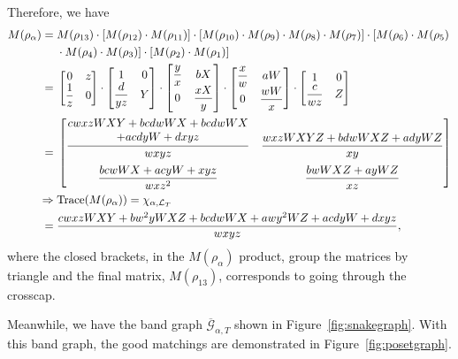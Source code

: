 \documentclass[pdftex]{sigma}
\numberwithin{equation}{section}
\theoremstyle{definition}
\begin{document}
Therefore, we have
\begin{align*}
 M( \rho _{\alpha }) ={}&M( \rho _{13}) \cdot [ M( \rho _{12}) \cdot M( \rho _{11})] \cdot [ M( \rho _{10}) \cdot M( \rho _{9}) \cdot M( \rho _{8}) \cdot M( \rho _{7})] \cdot [ M( \rho _{6}) \cdot M( \rho _{5}) \\
&	\cdot	M( \rho _{4}) \cdot M( \rho _{3})] \cdot [ M( \rho _{2}) \cdot M( \rho _{1})]
\\
={}&\begin{bmatrix}
0 & z\\
\dfrac{1}{z} & 0
\end{bmatrix} \cdot \begin{bmatrix}
1 & 0\\
\dfrac{d}{yz} & Y
\end{bmatrix} \cdot \begin{bmatrix}
\dfrac{y}{x} & bX\\
0 & \dfrac{xX}{y}
\end{bmatrix} \cdot \begin{bmatrix}
\dfrac{x}{w} & aW\\
0 & \dfrac{wW}{x}
\end{bmatrix} \cdot \begin{bmatrix}
1 & 0\\
\dfrac{c}{wz} & Z
\end{bmatrix}
\\
={}&\begin{bmatrix}
\dfrac{\begin{array}{@{}c@{}} cwxzWXY+bcdwWX+bcdwWX\\ +acdyW+dxyz\end{array}}{wxyz} & \dfrac{wxzWXYZ+bdwWXZ+adyWZ}{xy}\vspace{2mm}\\
\dfrac{bcwWX+acyW+xyz}{wxz^{2}} & \dfrac{bwWXZ+ayWZ}{xz}
\end{bmatrix}
\\
\Rightarrow{}& \mathbf{\text{Trace}}( M( \rho _{\alpha }))=\chi_{\alpha, \mathcal{L}_T} \\
={}&\frac{cwxzWXY+bw^{2} yWXZ+bcdwWX+awy^{2} WZ+acdyW+dxyz}{wxyz},
\end{align*}
where the closed brackets, in the $M(\rho_{\alpha})$ product, group the matrices by
triangle and the final matrix, $M(\rho_{13})$, corresponds to going through the crosscap.

Meanwhile, we have the band graph $\overline{\mathcal{G}}_{\alpha, T}$ shown in Figure~\ref{fig:snakegraph}. With this band graph, the good matchings are demonstrated in Figure~\ref{fig:posetgraph}.
\end{document}
